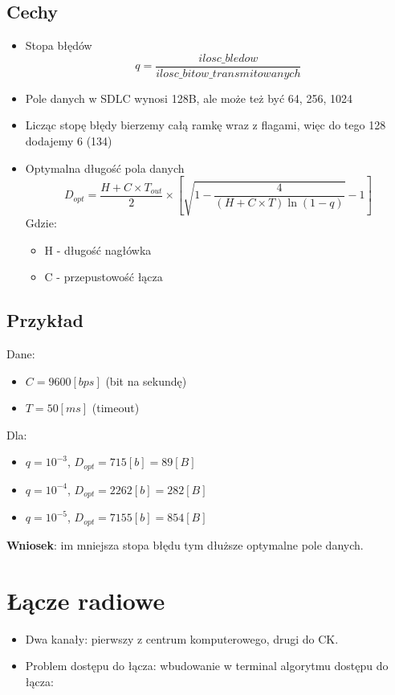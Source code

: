 		\subsection{Cechy}
			\begin{itemize}
				\item Stopa błędów 
				\begin{equation}
					q=\frac{ilosc\_bledow}{ilosc\_bitow\_transmitowanych} 
				\end{equation}
				\item Pole danych w SDLC wynosi 128B, ale może też być 64, 256, 1024
				\item Licząc stopę błędy bierzemy całą ramkę wraz z flagami, więc do tego 128 dodajemy 6 (134)
				\item Optymalna długość pola danych
				\begin{equation}
					D_{opt}=\frac{H+C\times{T_{out}}}{2}\times  [\sqrt{1-\frac{4}{(H+C\times{T})\ln{(1-q)}}}-1]
				\end{equation}
				Gdzie:
				\begin{itemize}
					\item H - długość nagłówka
					\item C - przepustowość łącza
				\end{itemize}
			\end{itemize}
		\subsection{Przykład}
			Dane:
			\begin{itemize}
				\item $ C=9600[bps] $ (bit na sekundę)
				\item $ T=50[ms] $ (timeout)
			\end{itemize}
			Dla:
			\begin{itemize}
				\item $ q=10^{-3} $, $ D_{opt}=715[b]=89[B] $
				\item $ q=10^{-4} $, $ D_{opt}=2262[b]=282[B] $
				\item $ q=10^{-5} $, $ D_{opt}=7155[b]=854[B] $
			\end{itemize}
			\textbf{Wniosek}: im mniejsza stopa błędu tym dłuższe optymalne pole danych.
	\section{Łącze radiowe}
		\begin{itemize}
			\item Dwa kanały: pierwszy z centrum komputerowego, drugi do CK.
			\item Problem dostępu do łącza: wbudowanie w terminal algorytmu dostępu do łącza:
		\end{itemize}

